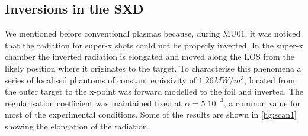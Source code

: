 \subsection{Inversions in the SXD}

We mentioned before conventional plasmas because, during MU01, it was noticed that the radiation for super-x shots could not be properly inverted. In the super-x chamber the inverted radiation is elongated and moved along the LOS from the likely position where it originates to the target. To characterise this phenomena a series of localised phantoms of constant emissivity of $1.26MW/m^3$, located from the outer target to the x-point was forward modelled to the foil and inverted. The regularisation coefficient was maintained fixed at $\alpha=5 \; 10^{-3}$, a common value for most of the experimental conditions. Some of the results are shown in \autoref{fig:scan1} showing the elongation of the radiation.


